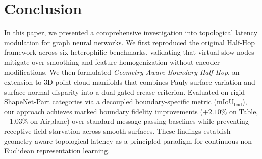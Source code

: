 \documentclass[journal]{IEEEtran}
\begin{document}
\section{Conclusion}
In this paper, we presented a comprehensive investigation into topological latency modulation for graph neural networks. We first reproduced the original Half-Hop framework across six heterophilic benchmarks, validating that virtual slow nodes mitigate over-smoothing and feature homogenization without encoder modifications. We then formulated \textit{Geometry-Aware Boundary Half-Hop}, an extension to 3D point-cloud manifolds that combines Pauly surface variation and surface normal disparity into a dual-gated crease criterion. Evaluated on rigid ShapeNet-Part categories via a decoupled boundary-specific metric ($\text{mIoU}_{\text{bnd}}$), our approach achieves marked boundary fidelity improvements ($+2.10\%$ on Table, $+1.03\%$ on Airplane) over standard message-passing baselines while preventing receptive-field starvation across smooth surfaces. These findings establish geometry-aware topological latency as a principled paradigm for continuous non-Euclidean representation learning.
\end{document}
